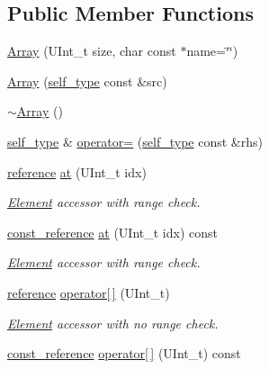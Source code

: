 \subsection*{Public Member Functions}
\begin{DoxyCompactItemize}
\item 
\hyperlink{classpanda_1_1Array_a05daeb194a5d5580d7c843374c45d610}{Array} (UInt\_\-t size, char const $\ast$name=\char`\"{}\char`\"{})
\item 
\hyperlink{classpanda_1_1Array_abe9578422f7f20d94532ad581404178a}{Array} (\hyperlink{classpanda_1_1Array}{self\_\-type} const \&src)
\item 
\hyperlink{classpanda_1_1Array_a98143dcae933f0bc7604aea8fb6c6439}{$\sim$Array} ()
\item 
\hyperlink{classpanda_1_1Array}{self\_\-type} \& \hyperlink{classpanda_1_1Array_ac13ad2768d4cc0fa018fe828b5db377c}{operator=} (\hyperlink{classpanda_1_1Array}{self\_\-type} const \&rhs)
\item 
\hyperlink{classpanda_1_1Array_a87028232d5fb96ae20e58e1a92dfe708}{reference} \hyperlink{classpanda_1_1Array_a4f8dde90c3132ac69fe01975137cda25}{at} (UInt\_\-t idx)
\begin{DoxyCompactList}\small\item\em \hyperlink{classpanda_1_1Element}{Element} accessor with range check. \item\end{DoxyCompactList}\item 
\hyperlink{classpanda_1_1Array_a64dff4ee5d35a16425535f06c3e2b3e2}{const\_\-reference} \hyperlink{classpanda_1_1Array_a00c7e7c983451a16d74901000cb1bbe1}{at} (UInt\_\-t idx) const 
\begin{DoxyCompactList}\small\item\em \hyperlink{classpanda_1_1Element}{Element} accessor with range check. \item\end{DoxyCompactList}\item 
\hyperlink{classpanda_1_1Array_a87028232d5fb96ae20e58e1a92dfe708}{reference} \hyperlink{classpanda_1_1Array_aaf72094bc5c101f74966d9aac34066cf}{operator\mbox{[}$\,$\mbox{]}} (UInt\_\-t)
\begin{DoxyCompactList}\small\item\em \hyperlink{classpanda_1_1Element}{Element} accessor with no range check. \item\end{DoxyCompactList}\item 
\hyperlink{classpanda_1_1Array_a64dff4ee5d35a16425535f06c3e2b3e2}{const\_\-reference} \hyperlink{classpanda_1_1Array_abbde72bcafdeadb574293543f44a7cf3}{operator\mbox{[}$\,$\mbox{]}} (UInt\_\-t) const 

\end{DoxyCompactItemize}
